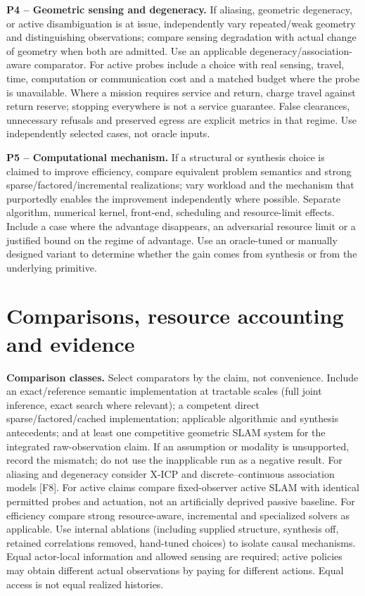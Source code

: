\documentclass[11pt,letterpaper]{article}
\newcommand{\status}[1]{\textbf{#1.}}
\begin{document}
\status{P4 -- Geometric sensing and degeneracy} If aliasing, geometric degeneracy, or active disambiguation is at issue, independently vary repeated/weak geometry and distinguishing observations; compare sensing degradation with actual change of geometry when both are admitted. Use an applicable degeneracy/association-aware comparator. For active probes include a choice with real sensing, travel, time, computation or communication cost and a matched budget where the probe is unavailable. Where a mission requires service and return, charge travel against return reserve; stopping everywhere is not a service guarantee. False clearances, unnecessary refusals and preserved egress are explicit metrics in that regime. Use independently selected cases, not oracle inputs.

\status{P5 -- Computational mechanism} If a structural or synthesis choice is claimed to improve efficiency, compare equivalent problem semantics and strong sparse/factored/incremental realizations; vary workload and the mechanism that purportedly enables the improvement independently where possible. Separate algorithm, numerical kernel, front-end, scheduling and resource-limit effects. Include a case where the advantage disappears, an adversarial resource limit or a justified bound on the regime of advantage. Use an oracle-tuned or manually designed variant to determine whether the gain comes from synthesis or from the underlying primitive.

\section{Comparisons, resource accounting and evidence}
\label{sec:eval}
\textbf{Comparison classes.} Select comparators by the claim, not convenience. Include an exact/reference semantic implementation at tractable scales (full joint inference, exact search where relevant); a competent direct sparse/factored/cached implementation; applicable algorithmic and synthesis antecedents; and at least one competitive geometric SLAM system for the integrated raw-observation claim. If an assumption or modality is unsupported, record the mismatch; do not use the inapplicable run as a negative result. For aliasing and degeneracy consider X-ICP and discrete--continuous association models [F8]. For active claims compare fixed-observer active SLAM with identical permitted probes and actuation, not an artificially deprived passive baseline. For efficiency compare strong resource-aware, incremental and specialized solvers as applicable. Use internal ablations (including supplied structure, synthesis off, retained correlations removed, hand-tuned choices) to isolate causal mechanisms. Equal actor-local information and allowed sensing are required; active policies may obtain different actual observations by paying for different actions. Equal access is not equal realized histories.
\end{document}
